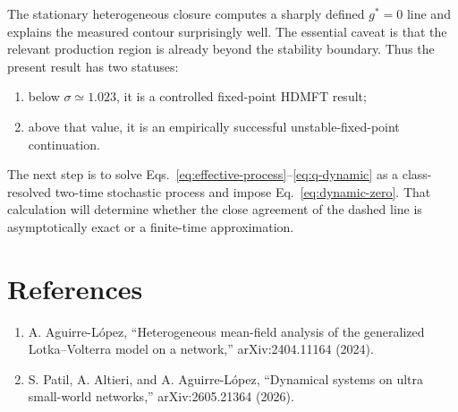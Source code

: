\documentclass[11pt]{article}
\begin{document}
The stationary heterogeneous closure computes a sharply defined $g^*=0$ line
and explains the measured contour surprisingly well.  The essential caveat is
that the relevant production region is already beyond the stability boundary.
Thus the present result has two statuses:
\begin{enumerate}
  \item below $\sigma\simeq1.023$, it is a controlled fixed-point HDMFT result;
  \item above that value, it is an empirically successful unstable-fixed-point
  continuation.
\end{enumerate}
The next step is to solve Eqs.~\eqref{eq:effective-process}--\eqref{eq:q-dynamic}
as a class-resolved two-time stochastic process and impose
Eq.~\eqref{eq:dynamic-zero}.  That calculation will determine whether the close
agreement of the dashed line is asymptotically exact or a finite-time
approximation.

\section*{References}
\begin{enumerate}
  \item A. Aguirre-L\'opez, ``Heterogeneous mean-field analysis of the
  generalized Lotka--Volterra model on a network,'' arXiv:2404.11164 (2024).
  \item S. Patil, A. Altieri, and A. Aguirre-L\'opez, ``Dynamical systems on
  ultra small-world networks,'' arXiv:2605.21364 (2026).
\end{enumerate}
\end{document}
